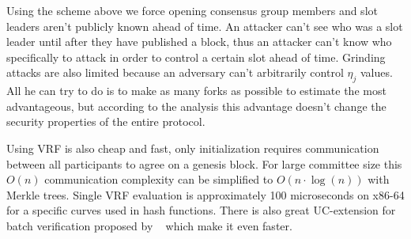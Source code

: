Using the scheme above we force opening consensus group members and slot leaders aren't publicly known ahead of time.
An attacker can't see who was a slot leader until after they have published a block, thus an attacker can't know
who specifically to attack in order to control a certain slot ahead of time.
Grinding attacks are also limited because an adversary can't arbitrarily control $\eta_j$ values.
All he can try to do is to make as many forks as possible to estimate the most advantageous, but according to the analysis this advantage doesn't change the security properties of the entire protocol.

Using VRF is also cheap and fast, only initialization requires communication between all participants to agree on a genesis block.
For large committee size this $O(n)$ communication complexity can be simplified to $O(n \cdot \log(n))$ with Merkle trees.
Single VRF evaluation is approximately 100 microseconds on x86-64 for a specific curves used in hash functions.
There is also great UC-extension for batch verification proposed by ~\cite{cryptoeprint:2022/1045} which make it even faster.
